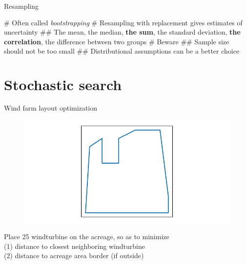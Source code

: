 \documentclass[12pt, aspectratio=149]{beamer}
\theoremstyle{plain}
\begin{document}
\begin{frame}[fragile]{Resampling}
	
	\begin{easylist}[itemize]
		# Often called \emph{bootstrapping}
		# Resampling with replacement gives estimates of uncertainty
		## The mean, the median, \textbf{the sum}, the standard deviation, \textbf{the correlation}, the difference between two groups
		# Beware
		## Sample size should not be too small
		## Distributional assumptions can be a better choice
	\end{easylist}
\end{frame}


\section{Stochastic search}

\begin{frame}[fragile]{Wind farm layout optimization}
\vspace*{-1em}
\begin{center}
 \begin{figure}
    	\centering
    	\includegraphics[width=0.99\linewidth]{figures/windfarm}
 \end{figure}
 \end{center}
\vspace*{-2em}
\begin{center}
Place 25 windturbine on the acreage, so as to minimize \\
(1) distance to closest neighboring windturbine \\
(2) distance to acreage area border (if outside)
\end{center}
\end{frame}
\end{document}
